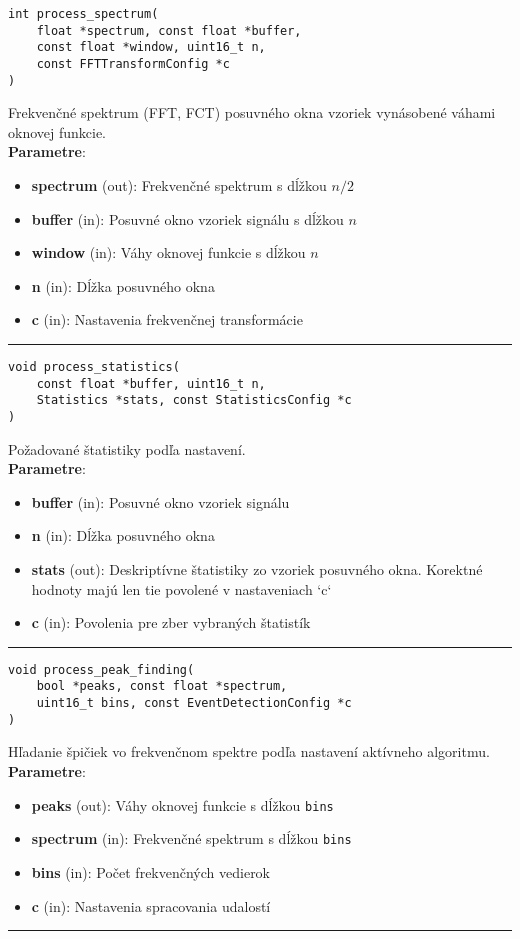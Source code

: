 \begin{lstlisting}[style=docs]
int process_spectrum(
	float *spectrum, const float *buffer, 
	const float *window, uint16_t n, 
	const FFTTransformConfig *c
)
\end{lstlisting}
Frekvenčné spektrum (FFT, FCT) posuvného okna vzoriek vynásobené váhami oknovej funkcie. \\ 
\textbf{Parametre}:
\begin{itemize}[noitemsep, topsep=0pt]
	\item \textbf{spectrum} (out): Frekvenčné spektrum s dĺžkou $n / 2$  
	\item \textbf{buffer} (in): Posuvné okno vzoriek signálu s dĺžkou $n$
	\item \textbf{window} (in): Váhy oknovej funkcie  s dĺžkou $n$
	\item \textbf{n} (in): Dĺžka posuvného okna
	\item \textbf{c} (in): Nastavenia frekvenčnej transformácie
\end{itemize}
\bigbreak
\hrule
\begin{lstlisting}[style=docs]
void process_statistics(
	const float *buffer, uint16_t n, 
	Statistics *stats, const StatisticsConfig *c
)
\end{lstlisting}
Požadované štatistiky podľa nastavení. \\ 
\textbf{Parametre}:
\begin{itemize}[noitemsep, topsep=0pt]
	\item \textbf{buffer} (in): Posuvné okno vzoriek signálu
 	\item \textbf{n} (in): Dĺžka posuvného okna
 	\item \textbf{stats} (out): Deskriptívne štatistiky zo vzoriek posuvného okna. 
 	Korektné hodnoty majú len tie povolené v nastaveniach `c`
	\item \textbf{c} (in): Povolenia pre zber vybraných štatistík
\end{itemize}
\bigbreak
\hrule

\begin{lstlisting}[style=docs]
void process_peak_finding(
	bool *peaks, const float *spectrum, 
	uint16_t bins, const EventDetectionConfig *c
)
\end{lstlisting}
Hľadanie špičiek vo frekvenčnom spektre podľa nastavení aktívneho algoritmu. \\ 
\textbf{Parametre}:
\begin{itemize}[noitemsep, topsep=0pt]
	\item \textbf{peaks} (out): Váhy oknovej funkcie  s dĺžkou \verb|bins|
 	\item \textbf{spectrum} (in):  Frekvenčné spektrum s dĺžkou \verb|bins|  
 	\item \textbf{bins} (in): Počet frekvenčných vedierok
 	\item \textbf{c} (in): Nastavenia spracovania udalostí
\end{itemize}
\bigbreak
\hrule

